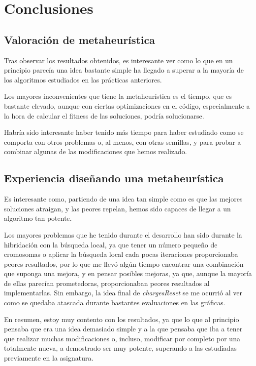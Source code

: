 \documentclass[11pt,a4paper]{article}
\begin{document}
\newpage
\section{Conclusiones}

\subsection{Valoración de metaheurística}

Tras observar los resultados obtenidos, es interesante ver como lo que en un principio parecía una idea bastante simple ha llegado a superar a la mayoría de los algoritmos estudiados en las prácticas anteriores.

Los mayores inconvenientes que tiene la metaheurística es el tiempo, que es bastante elevado, aunque con ciertas optimizaciones en el código, especialmente a la hora de calcular el fitness de las soluciones, podría solucionarse.

Habría sido interesante haber tenido más tiempo para haber estudiado como se comporta con otros problemas o, al menos, con otras semillas, y para probar a combinar algunas de las modificaciones que hemos realizado.

\subsection{Experiencia diseñando una metaheurística}

Es interesante como, partiendo de una idea tan simple como es que las mejores soluciones atraigan, y las peores repelan, hemos sido capaces de llegar a un algoritmo tan potente.

Los mayores problemas que he tenido durante el desarrollo han sido durante la hibridación con la búsqueda local, ya que tener un número pequeño de cromosomas o aplicar la búsqueda local cada pocas iteraciones proporcionaba peores resultados, por lo que me llevó algún tiempo encontrar una combinación que suponga una mejora, y en pensar posibles mejoras, ya que, aunque la mayoría de ellas parecían prometedoras, proporcionaban peores resultados al implementarlas. Sin embargo, la idea final de \emph{chargesReset} se me ocurrió al ver como se quedaba atascada durante bastantes evaluaciones en las gráficas.

En resumen, estoy muy contento con los resultados, ya que lo que al principio pensaba que era una idea demasiado simple y a la que pensaba que iba a tener que realizar muchas modificaciones o, incluso, modificar por completo por una totalmente nueva, a demostrado ser muy potente, superando a las estudiadas previamente en la asignatura.
\end{document}
